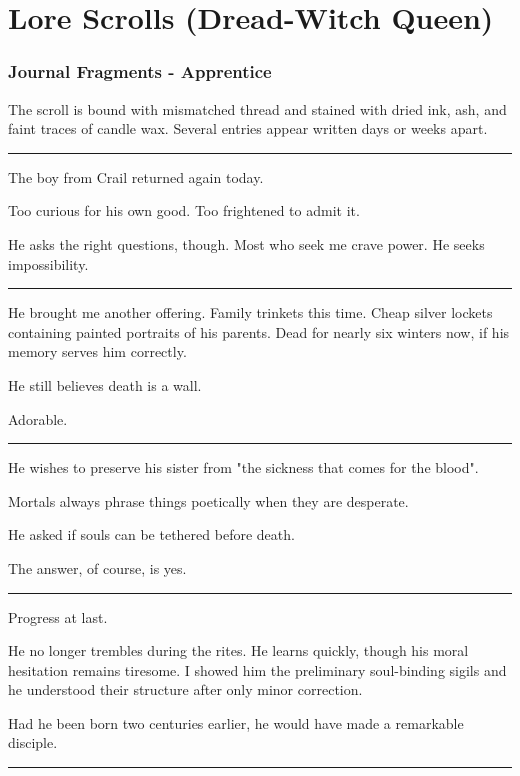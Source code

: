 \chapter*{Lore Scrolls (Dread-Witch Queen)}\label{resource:LoreScrollsDreadWitchQueen}
\subsection*{Journal Fragments - Apprentice}
The scroll is bound with mismatched thread and stained with dried ink, ash, and faint traces of candle wax. Several entries appear written days or weeks apart.

\noindent\rule{\linewidth}{0.4pt}

{\entryfont The boy from Crail returned again today.

Too curious for his own good. Too frightened to admit it.

He asks the right questions, though. Most who seek me crave power. He seeks impossibility.}

\noindent\rule{\linewidth}{0.6pt}

{\entryfont He brought me another offering. Family trinkets this time. Cheap silver lockets containing painted portraits of his parents. Dead for nearly six winters now, if his memory serves him correctly.

He still believes death is a wall.

Adorable.}

\noindent\rule{\linewidth}{0.4pt}

{\entryfont He wishes to preserve his sister from "the sickness that comes for the blood".

Mortals always phrase things poetically when they are desperate.

He asked if souls can be tethered before death.

The answer, of course, is yes.}

\noindent\rule{\linewidth}{0.4pt}

{\entryfont Progress at last.

He no longer trembles during the rites. He learns quickly, though his moral hesitation remains tiresome. I showed him the preliminary soul-binding sigils and he understood their structure after only minor correction.

Had he been born two centuries earlier, he would have made a remarkable disciple.}

\noindent\rule{\linewidth}{0.4pt}

